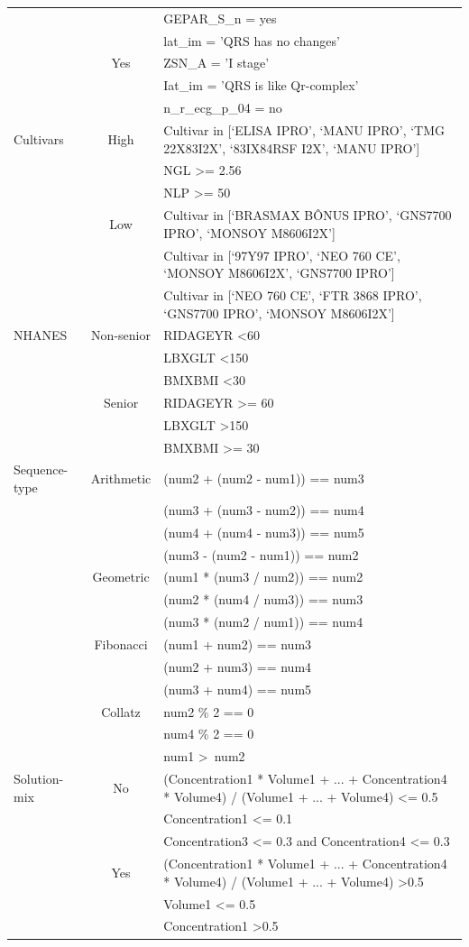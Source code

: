 \documentclass{article}
\theoremstyle{plain}
\theoremstyle{definition}
\theoremstyle{remark}
\begin{document}
{\begin{longtable}{lcl}
 &  & GEPAR\_S\_n = yes \\
 &  & lat\_im = 'QRS has no changes' \\
 & Yes & ZSN\_A = 'I stage' \\
 &  & Iat\_im = 'QRS is like Qr-complex' \\
 &  & n\_r\_ecg\_p\_04 = no \\ \midrule
Cultivars & High & Cultivar in {[}`ELISA IPRO', `MANU IPRO', `TMG 22X83I2X', `83IX84RSF I2X', `MANU IPRO'{]} \\
 &  & NGL \textgreater{}= 2.56 \\
 &  & NLP \textgreater{}= 50 \\
 & Low & Cultivar in {[}`BRASMAX BÔNUS IPRO', `GNS7700 IPRO', `MONSOY M8606I2X'{]} \\
 &  & Cultivar in {[}`97Y97 IPRO', `NEO 760 CE', `MONSOY M8606I2X', `GNS7700 IPRO'{]} \\
 &  & Cultivar in {[}`NEO 760 CE', `FTR 3868 IPRO', `GNS7700 IPRO', `MONSOY M8606I2X'{]} \\ \midrule
NHANES & Non-senior & RIDAGEYR \textless 60 \\
 &  & LBXGLT \textless 150 \\
 &  & BMXBMI \textless 30 \\
 & Senior & RIDAGEYR \textgreater{}= 60 \\
 &  & LBXGLT \textgreater 150 \\
 &  & BMXBMI \textgreater = 30 \\ \midrule
Sequence-type & Arithmetic & (num2 + (num2 - num1)) == num3 \\
 &  & (num3 + (num3 - num2)) == num4 \\
 &  & (num4 + (num4 - num3)) == num5 \\
 &  & (num3 - (num2 - num1)) == num2 \\
 & Geometric & (num1 * (num3 / num2)) == num2 \\
 &  & (num2 * (num4 / num3)) == num3 \\
 &  & (num3 * (num2 / num1)) == num4 \\
 & Fibonacci & (num1 + num2) == num3 \\
 &  & (num2 + num3) == num4 \\
 &  & (num3 + num4) == num5 \\
 & Collatz & num2 \% 2 == 0 \\
 &  & num4 \% 2 == 0 \\
 &  & num1 \textgreater \ num2 \\ \midrule
Solution-mix & No & (Concentration1 * Volume1 + ... + Concentration4 * Volume4) / (Volume1 + ... + Volume4) \textless{}= 0.5 \\
 &  & Concentration1 \textless{}= 0.1 \\
 &  & Concentration3 \textless{}= 0.3 and Concentration4 \textless{}= 0.3 \\
 & Yes & (Concentration1 * Volume1 + ... + Concentration4 * Volume4) / (Volume1 + ... + Volume4) \textgreater 0.5 \\
 &  & Volume1 \textless{}= 0.5 \\
 &  & Concentration1 \textgreater 0.5 \\
 \bottomrule
\end{longtable}}
\end{document}

